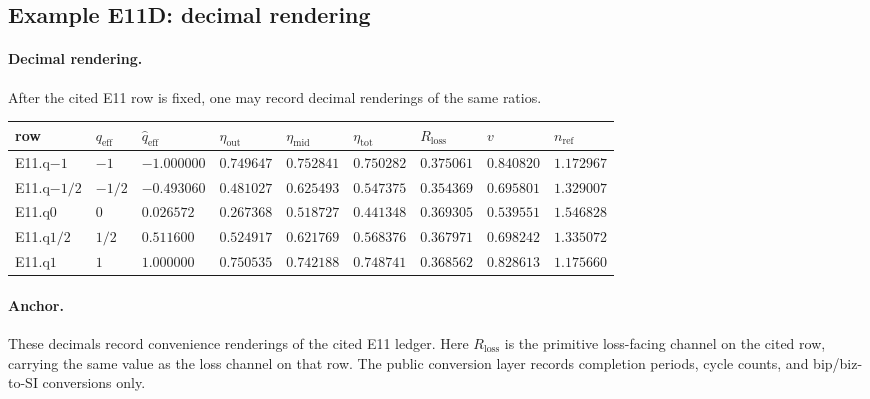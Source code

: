 \subsection{Example E11D: decimal rendering}\label{app:e11-dict}
\paragraph{Decimal rendering.} After the cited E11 row is fixed, one may record decimal renderings of the same ratios.
{\footnotesize
\begin{center}
\begin{tabular}{@{}lllllllll@{}}
\toprule
row & $q_{\mathrm{eff}}$ & $\widehat q_{\mathrm{eff}}$ & $\eta_{\mathrm{out}}$ & $\eta_{\mathrm{mid}}$ & $\eta_{\mathrm{tot}}$ & $R_{\mathrm{loss}}$ & $v$ & $n_{\mathrm{ref}}$ \\
\midrule
E11.q$-1$ & $-1$ & $-1.000000$ & $0.749647$ & $0.752841$ & $0.750282$ & $0.375061$ & $0.840820$ & $1.172967$ \\
E11.q$-1/2$ & $-1/2$ & $-0.493060$ & $0.481027$ & $0.625493$ & $0.547375$ & $0.354369$ & $0.695801$ & $1.329007$ \\
E11.q$0$ & $0$ & $0.026572$ & $0.267368$ & $0.518727$ & $0.441348$ & $0.369305$ & $0.539551$ & $1.546828$ \\
E11.q$1/2$ & $1/2$ & $0.511600$ & $0.524917$ & $0.621769$ & $0.568376$ & $0.367971$ & $0.698242$ & $1.335072$ \\
E11.q$1$ & $1$ & $1.000000$ & $0.750535$ & $0.742188$ & $0.748741$ & $0.368562$ & $0.828613$ & $1.175660$ \\
\bottomrule
\end{tabular}
\end{center}}
\paragraph{Anchor.} These decimals record convenience renderings of the cited E11 ledger. Here $R_{\mathrm{loss}}$ is the primitive loss-facing channel on the cited row, carrying the same value as the loss channel on that row. The public conversion layer records completion periods, cycle counts, and bip/biz-to-SI conversions only.
